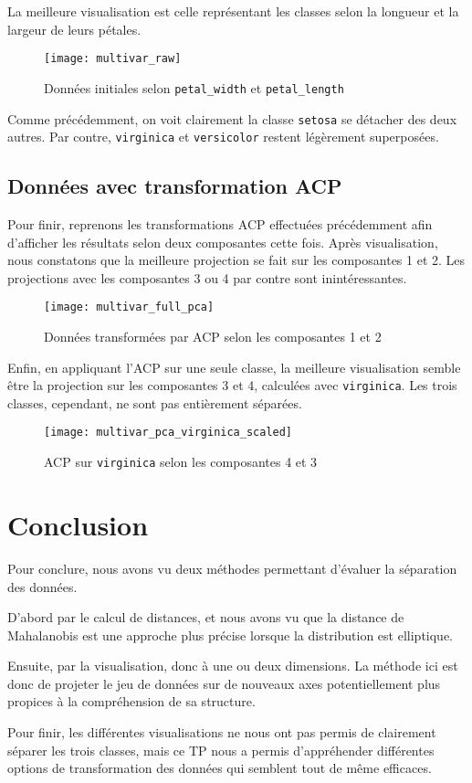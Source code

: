 \documentclass[french]{report}
\begin{document}
    La meilleure visualisation est celle représentant les classes selon la longueur et la largeur de leurs pétales.
    
    \begin{figure}[h]
        \centering
        \texttt{[image: multivar\_raw]}
        \caption{Données initiales selon \texttt{petal\_width} et \texttt{petal\_length}}
    \end{figure}
    
    Comme précédemment, on voit clairement la classe \texttt{setosa} se détacher des deux autres.
    Par contre, \texttt{virginica} et \texttt{versicolor} restent légèrement superposées.
    
    \section{Données avec transformation ACP}
    
    Pour finir, reprenons les transformations ACP effectuées précédemment afin d'afficher les résultats selon deux composantes cette fois.
    Après visualisation, nous constatons que la meilleure projection se fait sur les composantes 1 et 2.
    Les projections avec les composantes 3 ou 4 par contre sont inintéressantes.
    \newpage
    \begin{figure}[h]
        \centering
        \texttt{[image: multivar\_full\_pca]}
        \caption{Données transformées par ACP selon les composantes 1 et 2}
    \end{figure}
    \leavevmode
    
    Enfin, en appliquant l'ACP sur une seule classe, la meilleure visualisation semble être la projection sur les composantes 3 et 4, calculées avec \texttt{virginica}.
    Les trois classes, cependant, ne sont pas entièrement séparées.
    
    \begin{figure}[!h]
        \centering
        \texttt{[image: multivar\_pca\_virginica\_scaled]}
        \caption{ACP sur \texttt{virginica} selon les composantes 4 et 3}
    \end{figure}
    
    \chapter*{Conclusion}
    
    Pour conclure, nous avons vu deux méthodes permettant d'évaluer la séparation des données.
    
    D'abord par le calcul de distances, et nous avons vu que la distance de Mahalanobis est une approche plus précise lorsque la distribution est elliptique.
    
    Ensuite, par la visualisation, donc à une ou deux dimensions.
    La méthode ici est donc de projeter le jeu de données sur de nouveaux axes potentiellement plus propices à la compréhension de sa structure.
    
    Pour finir, les différentes visualisations ne nous ont pas permis de clairement séparer les trois classes, mais ce TP nous a permis d'appréhender différentes options de transformation des données qui semblent tout de même efficaces.
\end{document}
